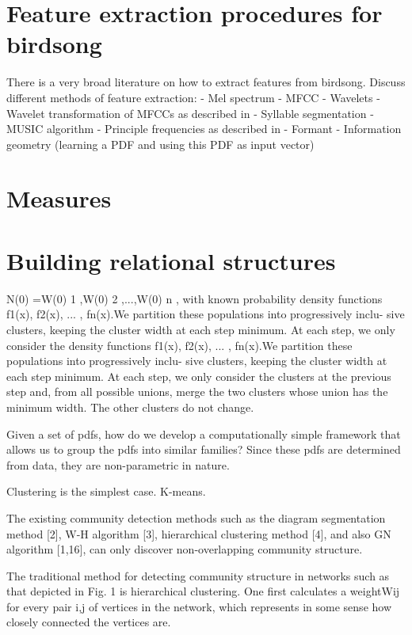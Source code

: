 \documentclass[../main.tex]{subfiles}
\begin{document}
\section{Feature extraction procedures for birdsong} \label{features_review}
There is a very broad literature on how to extract features from birdsong. 
Discuss different methods of feature extraction:
- Mel spectrum
- MFCC
- Wavelets
- Wavelet transformation of MFCCs as described in \cite{Chou2009}
- Syllable segmentation
- MUSIC algorithm
- Principle frequencies as described in \cite{Chou2008}
- Formant
- Information geometry (learning a PDF and using this PDF as input vector)



\section{Measures}\label{measures_review}
\section{Building relational structures}\label{algorithms_review}

\cite{VoVan2010}
N(0) ={W(0)
1 ,W(0) 2 ,...,W(0) n }, with known probability
density functions {f1(x), f2(x), ... , fn(x)}.We partition these populations into progressively inclu- sive clusters, keeping the cluster width at each step minimum. At each step, we only consider the
density functions {f1(x), f2(x), ... , fn(x)}.We partition these populations into progressively inclu- sive clusters, keeping the cluster width at each step minimum. At each step, we only consider the
clusters at the previous step and, from all possible unions, merge the two clusters whose union
has the minimum width. The other clusters do not change.

\cite{Goh2008}
Given a set of pdfs, how do
we develop a computationally simple framework that allows us to group the pdfs into
similar families? Since these pdfs are determined from data, they are non-parametric in
nature.

\cite{hastie2008}
Clustering is the simplest case. K-means. 

\cite{Lu2012}
    The existing community detection methods such as the
diagram segmentation method [2], W-H algorithm [3], hierarchical clustering method [4], and also GN algorithm [1,16], can
only discover non-overlapping community
structure.


\cite{Girvan2002}
The traditional method for detecting community structure in networks such as that depicted in Fig. 1 is
hierarchical clustering. One first calculates a weightWij for every
pair i,j of vertices in the network, which represents in some sense
how closely connected the vertices are.
\end{document}
